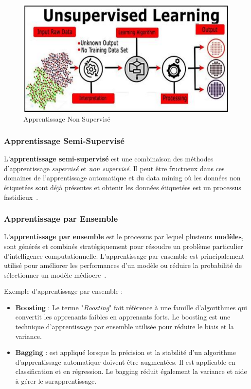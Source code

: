 \begin{figure}[!h]
	\centering
	\includegraphics[width=0.6\linewidth]{images/unsupervisedlearning}
	\caption{Apprentissage Non Supervisé}
	\label{fig:unsupervisedlearning}
\end{figure}

\subsubsection{Apprentissage Semi-Supervisé}
L'\textbf{apprentissage semi-supervisé} est une combinaison des méthodes d'apprentissage \textit{supervisé} et \textit{non supervisé}. Il peut être fructueux dans ces domaines de l'apprentissage automatique et du data mining où les données non étiquetées sont déjà présentes et obtenir les données étiquetées est un processus fastidieux~\cite{Machine2020Batta}. 
\subsubsection{Apprentissage par Ensemble}
L'\textbf{apprentissage par ensemble} est le processus par lequel plusieurs \textbf{modèles}, sont générés et combinés stratégiquement pour résoudre un problème particulier d'intelligence computationnelle. L'apprentissage par ensemble est principalement utilisé pour améliorer les performances d'un modèle ou réduire la probabilité de sélectionner un modèle médiocre~\cite{Machine2020Batta}. 

Exemple d'apprentissage par ensemble :
\begin{itemize}
	\item \textbf{Boosting} : Le terme "\textit{Boosting}" fait référence à une famille d'algorithmes qui convertit les apprenants faibles en apprenants forts. Le boosting est une technique d'apprentissage par ensemble utilisée pour réduire le biais et la variance.
	\item \textbf{Bagging} : est appliqué lorsque la précision et la stabilité d'un algorithme d'apprentissage automatique doivent être augmentées. Il est applicable en classification et en régression. Le bagging réduit également la variance et aide à gérer le surapprentissage.
\end{itemize}

